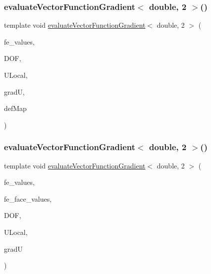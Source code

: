 \mbox{\label{function_evaluations_8cc_a2d6fafd5544183a2ed0f3190b142c853}} 
\subsubsection{\texorpdfstring{evaluate\+Vector\+Function\+Gradient$<$ double, 2 $>$()}{evaluateVectorFunctionGradient< double, 2 >()}\hspace{0.1cm}{\footnotesize\ttfamily [2/4]}}
{\footnotesize\ttfamily template void \mbox{\hyperlink{group___evaluation_functions_ga9608539d601a91aff1ba01ccc720fbe0}{evaluate\+Vector\+Function\+Gradient}}$<$ double, 2 $>$ (\begin{DoxyParamCaption}\item[{const F\+E\+Values$<$ 2 $>$ \&}]{fe\+\_\+values,  }\item[{unsigned int}]{D\+OF,  }\item[{Table$<$ 1, double $>$ \&}]{U\+Local,  }\item[{Table$<$ 3, double $>$ \&}]{gradU,  }\item[{\mbox{\hyperlink{structdeformation_map}{deformation\+Map}}$<$ double, 2 $>$ \&}]{def\+Map }\end{DoxyParamCaption})}

\mbox{\label{function_evaluations_8cc_a729ea5c9032a46494dbeb1c6e1a678c6}} 
\subsubsection{\texorpdfstring{evaluate\+Vector\+Function\+Gradient$<$ double, 2 $>$()}{evaluateVectorFunctionGradient< double, 2 >()}\hspace{0.1cm}{\footnotesize\ttfamily [3/4]}}
{\footnotesize\ttfamily template void \mbox{\hyperlink{group___evaluation_functions_ga9608539d601a91aff1ba01ccc720fbe0}{evaluate\+Vector\+Function\+Gradient}}$<$ double, 2 $>$ (\begin{DoxyParamCaption}\item[{const F\+E\+Values$<$ 2 $>$ \&}]{fe\+\_\+values,  }\item[{const F\+E\+Face\+Values$<$ 2 $>$ \&}]{fe\+\_\+face\+\_\+values,  }\item[{unsigned int}]{D\+OF,  }\item[{Table$<$ 1, double $>$ \&}]{U\+Local,  }\item[{Table$<$ 3, double $>$ \&}]{gradU }\end{DoxyParamCaption})}

